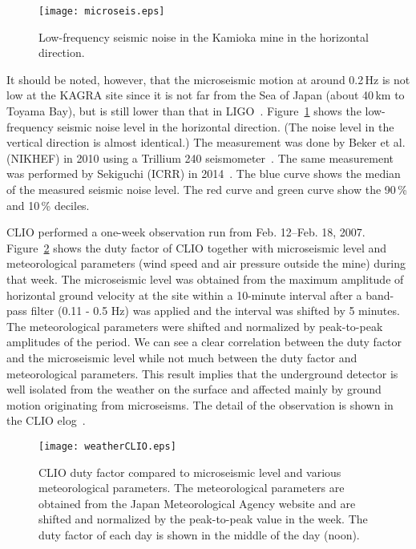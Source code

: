 \documentclass[prd ,twocolumn ,secnumarabic,dvips
,amssymb, amsmath,nobibnotes, aps, prd,superscriptaddress]{revtex4-1}
\begin{document}
{\begin{figure}[htbp]
	\begin{center}
		\texttt{[image: microseis.eps]}
		\caption{\label{fig:microseis}Low-frequency seismic noise in the Kamioka mine in the horizontal direction.}
		\label{microseis}
	\end{center}
\end{figure}
It should be noted, however, that the microseismic motion at around 0.2\,Hz is not low at the KAGRA site since it is not far from the Sea of Japan (about 40\,km to Toyama Bay), but is still lower than that in LIGO~\cite{LIGOseis}. Figure~\ref{microseis} shows the low-frequency seismic noise level in the horizontal direction. (The noise level in the vertical direction is almost identical.) The measurement was done by Beker et al. (NIKHEF) in 2010 using a Trillium 240 seismometer~\cite{NIKHEFmeasurement}. The same measurement was performed by Sekiguchi (ICRR) in 2014~\cite{Sekiguchi}. The blue curve shows the median of the measured seismic noise level. The red curve and green curve show the 90\,\% and 10\,\% deciles. 

CLIO performed a one-week observation run from Feb. 12--Feb. 18, 2007. Figure~\ref{fig:weatherCLIO} shows the duty factor of CLIO together with microseismic level and meteorological parameters (wind speed and air pressure outside the mine) during that week. The microseismic level was obtained from the maximum amplitude of horizontal ground velocity at the site within a 10-minute interval after a band-pass filter (0.11 - 0.5 Hz) was applied and the interval was shifted by 5 minutes. The meteorological parameters were shifted and normalized by peak-to-peak amplitudes of the period. We can see a clear correlation between the duty factor and the microseismic level while not much between the duty factor and meteorological parameters. This result implies that the underground detector is well isolated from the weather on the surface and affected mainly by ground motion originating from microseisms. The detail of the observation is shown in the CLIO elog~\cite{CLIOelog}.

\begin{figure}[htbp]
\centering
		\texttt{[image: weatherCLIO.eps]}
		\caption{\label{fig:weatherCLIO}CLIO duty factor compared to microseismic level and various meteorological parameters. The meteorological parameters are obtained from the Japan Meteorological Agency website and are shifted and normalized by the peak-to-peak value in the week. The duty factor of each day is shown in the middle of the day (noon).}
\end{figure}


}
\end{document}
